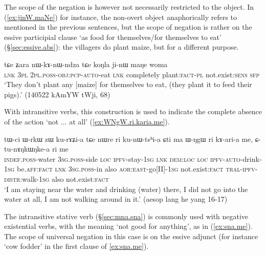 The scope of the negation is however not necessarily restricted to the object. In (\ref{ex:jinW.maNe}) for instance, the non-overt object anaphorically refers to  mentioned in the previous sentences, but the scope of negation is rather on the essive participial clause  `as food for themselves/for themselves to eat' (§\ref{sec:essive.abs}): the villagers do  plant maize, but for a different purpose.
 
\begin{exe}
\ex \label{ex:jinW.maNe}
\gll tɕe ʑara nɯ-kɤ-nɯ-ndza tɕe koŋla ji-nɯ maŋe woma \\
\textsc{lnk} \textsc{3pl} \textsc{2pl}.\textsc{poss}-\textsc{obj}:\textsc{pcp}-\textsc{auto}-eat \textsc{lnk} completely plant:\textsc{fact}-\textsc{pl} not.exist:\textsc{sens} \textsc{sfp} \\
\glt `They don't  plant any [maize] for themselves to  eat, (they plant it to feed their pigs).'  (140522 kAmYW tWji, 68)
\end{exe}

With intransitive verbs, this construction is used to indicate the complete absence of the action `not ... at all' (\ref{ex:WNgW.ri.karia.me}).

\begin{exe}
\ex \label{ex:WNgW.ri.karia.me} 
\gll  tɯ-ci ɯ-rkɯ zɯ ku-rɤʑi-a tɕe nɯre ri ku-nɯ-tsʰi-a ɕti ma ɯ-ŋgɯ ri kɤ-ari-a me, ɕ-tu-nɤŋkɯŋke-a ri me \\
\textsc{indef}.\textsc{poss}-water \textsc{3sg}.\textsc{poss}-side \textsc{loc} \textsc{ipfv}-stay-\textsc{1sg} \textsc{lnk} \textsc{dem}:\textsc{loc} \textsc{loc} \textsc{ipfv}-\textsc{auto}-drink-\textsc{1sg} be.\textsc{aff}:\textsc{fact} \textsc{lnk} \textsc{3sg}.\textsc{poss}-in also \textsc{aor}:\textsc{east}-go[II]-\textsc{1sg} not.exist:\textsc{fact} \textsc{tral}-\textsc{ipfv}-\textsc{distr}:walk-\textsc{1sg} also not.exist:\textsc{fact} \\
\glt `I am staying near the water and drinking (water) there, I did not go into the water at all, I am not walking around in it.' (aesop lang he yang 16-17)
\end{exe}

The intransitive stative verb  (§\ref{sec:mna.sna}) is commonly used with negative existential verbs, with the meaning `not good for anything', as in (\ref{ex:sna.me}). The scope of universal negation in this case is on the essive adjunct (for instance  `cow fodder' in the first clause of \ref{ex:sna.me}).

